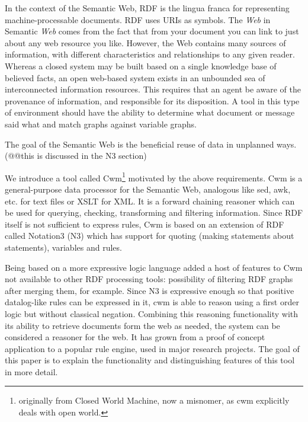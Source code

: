 \documentclass{tlp}
\begin{document}
\par In the context of the Semantic Web, RDF is the lingua franca for
representing machine-processable documents. RDF uses URIs as
symbols. The {\it Web} in Semantic {\it Web} comes from the fact
that from your document you can link to just about any web resource
you like. However, the Web contains many sources of information,
with different characteristics and relationships to any given
reader. Whereas a closed system may be built based on a single
knowledge base of believed facts, an open web-based system exists
in an unbounded sea of interconnected information resources. This
requires that an agent be aware of the provenance of information,
and responsible for its disposition. A tool in this type of
environment should have the ability to determine what document or
message said what and match graphs against variable graphs.

\par The goal of the Semantic Web is the beneficial reuse of data in
unplanned ways. (@@this is discussed in the N3 section)

\par We introduce a tool called Cwm\footnote{originally
from Closed World Machine, now a misnomer, as cwm explicitly deals
with open world.} motivated by the above requirements. Cwm is a
general-purpose data processor for the Semantic Web, analogous like
sed, awk, etc. for text files or XSLT for XML. It is a forward
chaining reasoner which can be used for querying, checking,
transforming and filtering information. Since RDF itself is not
sufficient to express rules, Cwm is based on an extension of RDF
called Notation3 (N3) which has support for quoting (making
statements about statements), variables and rules.

\par Being based on a more expressive logic language added a host of
features to Cwm not available to other RDF processing tools:
possibility of filtering RDF graphs after merging them, for
example. Since N3 is expressive enough so that positive
datalog-like rules can be expressed in it, cwm is able to reason
using a first order logic but without classical negation. Combining
this reasoning functionality with its ability to retrieve documents
form the web as needed, the system can be considered a reasoner for
the web. It has grown from a proof of concept application to a
popular rule engine, used in major research projects. The goal of
this paper is to explain the functionality and distinguishing
features of this tool in more detail.
\end{document}
